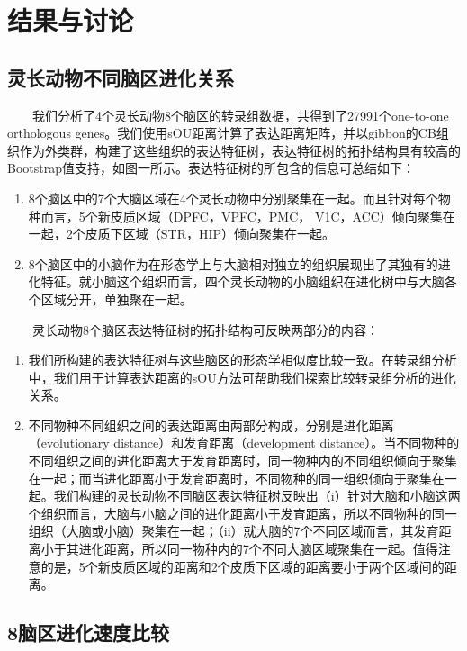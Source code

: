 \documentclass[hyperref,]{ctexart}
\providecommand{\tightlist}{%
  \setlength{\itemsep}{0pt}\setlength{\parskip}{0pt}}
\begin{document}
\section{结果与讨论}

\subsection{灵长动物不同脑区进化关系}

  我们分析了4个灵长动物8个脑区的转录组数据，共得到了27991个one-to-one
orthologous
genes。我们使用sOU距离计算了表达距离矩阵，并以gibbon的CB组织作为外类群，构建了这些组织的表达特征树，表达特征树的拓扑结构具有较高的Bootstrap值支持，如图一所示。表达特征树的所包含的信息可总结如下：

\begin{enumerate}
\def\labelenumi{\arabic{enumi}.}
\tightlist
\item
  8个脑区中的7个大脑区域在4个灵长动物中分别聚集在一起。而且针对每个物种而言，5个新皮质区域（DPFC，VPFC，PMC，
  V1C，ACC）倾向聚集在一起，2个皮质下区域（STR，HIP）倾向聚集在一起。
\item
  8个脑区中的小脑作为在形态学上与大脑相对独立的组织展现出了其独有的进化特征。就小脑这个组织而言，四个灵长动物的小脑组织在进化树中与大脑各个区域分开，单独聚在一起。
\end{enumerate}

  灵长动物8个脑区表达特征树的拓扑结构可反映两部分的内容：

\begin{enumerate}
\def\labelenumi{\arabic{enumi}.}
\tightlist
\item
  我们所构建的表达特征树与这些脑区的形态学相似度比较一致。在转录组分析中，我们用于计算表达距离的sOU方法可帮助我们探索比较转录组分析的进化关系。
\item
  不同物种不同组织之间的表达距离由两部分构成，分别是进化距离（evolutionary
  distance）和发育距离（development
  distance）。当不同物种的不同组织之间的进化距离大于发育距离时，同一物种内的不同组织倾向于聚集在一起；而当进化距离小于发育距离时，不同物种的同一组织倾向于聚集在一起。我们构建的灵长动物不同脑区表达特征树反映出（i）针对大脑和小脑这两个组织而言，大脑与小脑之间的进化距离小于发育距离，所以不同物种的同一组织（大脑或小脑）聚集在一起；（ii）就大脑的7个不同区域而言，其发育距离小于其进化距离，所以同一物种内的7个不同大脑区域聚集在一起。值得注意的是，5个新皮质区域的距离和2个皮质下区域的距离要小于两个区域间的距离。
\end{enumerate}

\subsection{8脑区进化速度比较}
\end{document}
